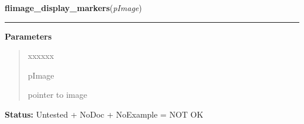 \hspace{.8\funcindent}\begin{boxedminipage}{\funcwidth}

    \raggedright \textbf{flimage\_display\_markers}(\textit{pImage})

    \vspace{-1.5ex}

    \rule{\textwidth}{0.5\fboxrule}
\setlength{\parskip}{2ex}
\setlength{\parskip}{1ex}
      \textbf{Parameters}
      \vspace{-1ex}

      \begin{quote}
        \begin{Ventry}{xxxxxx}

          \item[pImage]

          pointer to image

        \end{Ventry}

      \end{quote}

\textbf{Status:} Untested + NoDoc + NoExample = NOT OK



    \end{boxedminipage}

    \label{xformslib:library:flimage_dup_}

    \vspace{0.5ex}

